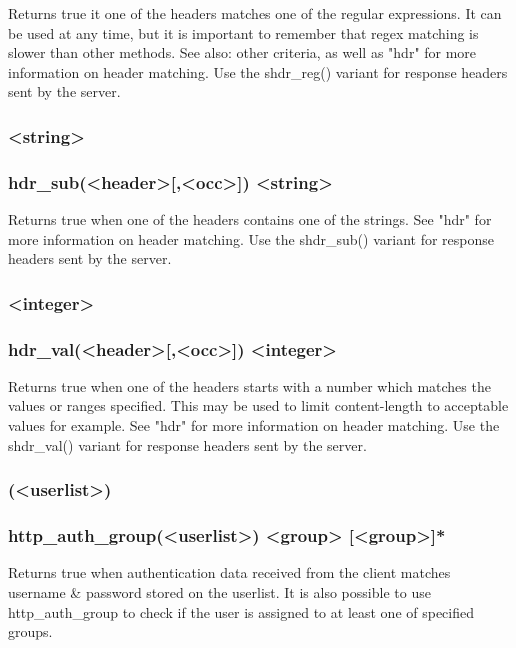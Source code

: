   Returns true it one of the headers matches one of the regular expressions. It
  can be used at any time, but it is important to remember that regex matching
  is slower than other methods.
See also: other  criteria, as well as
  "hdr" for more information on header matching. Use the shdr\_reg() variant for
  response headers sent by the server.

\subsubsection[hdr\_sub]{ <string>}
\subsubsection*{hdr\_sub(<header>[,<occ>]) <string>}

  Returns true when one of the headers contains one of the strings. See "hdr"
  for more information on header matching. Use the shdr\_sub() variant for
  response headers sent by the server.

\subsubsection[hdr\_val]{ <integer>}
\subsubsection*{hdr\_val(<header>[,<occ>]) <integer>}

  Returns true when one of the headers starts with a number which matches the
  values or ranges specified. This may be used to limit content-length to
  acceptable values for example. See "hdr" for more information on header
  matching. Use the shdr\_val() variant for response headers sent by the server.

\subsubsection[http\_auth]{(<userlist>)}
\subsubsection[http\_auth\_group]{http\_auth\_group(<userlist>) <group> [<group>]*}

  Returns true when authentication data received from the client matches
  username \& password stored on the userlist. It is also possible to
  use http\_auth\_group to check if the user is assigned to at least one
  of specified groups.


